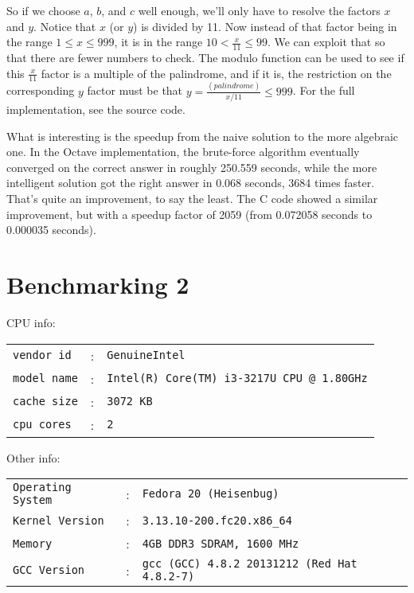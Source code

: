 \documentclass{article}
\begin{document}
So if we choose $a$, $b$, and $c$ well enough, we’ll only have to resolve the factors $x$ and
$y$. Notice that $x$ (or $y$) is divided by 11. Now instead of that factor being in the range 
$1 \leq x \leq 999$, it is in the range $10 < \frac{x}{11} \leq 99$. We can exploit that so 
that there are fewer numbers to check. The modulo function can be used to see if this 
$\frac{x}{11}$ factor is a multiple of the palindrome, and if it is, the restriction on the 
corresponding $y$ factor must be that $y = \frac{(palindrome)}{x/11} \leq 999$. For the full 
implementation, see the source code.

What is interesting is the speedup from the naive solution to the more algebraic one. In the 
Octave implementation, the brute-force algorithm eventually converged on the correct answer 
in roughly 250.559 seconds, while the more intelligent solution got the right answer in 0.068 
seconds, 3684 times faster. That’s quite an improvement, to say the least. The C code showed 
a similar improvement, but with a speedup factor of 2059 (from 0.072058 seconds to 0.000035 
seconds).

\section*{Benchmarking 2}
\noindent CPU info:

\begin{tabular}{lcl}
\texttt{vendor id} 	& : & \texttt{GenuineIntel}									\\
\texttt{model name}	& : & \texttt{Intel(R) Core(TM) i3-3217U CPU @ 1.80GHz}		\\
\texttt{cache size}	& : & \texttt{3072 KB}										\\
\texttt{cpu cores}	& : & \texttt{2}
\end{tabular}

\noindent Other info:

\begin{tabular}{lcl}
\texttt{Operating System}	& : & \texttt{Fedora 20 (Heisenbug)}						\\
\texttt{Kernel Version}		& : & \texttt{3.13.10-200.fc20.x86\_64}						\\
\texttt{Memory}				& : & \texttt{4GB DDR3 SDRAM, 1600 MHz}						\\
\texttt{GCC Version}		& : & \texttt{gcc (GCC) 4.8.2 20131212 (Red Hat 4.8.2-7)}	\\
\end{tabular}
\end{document}
